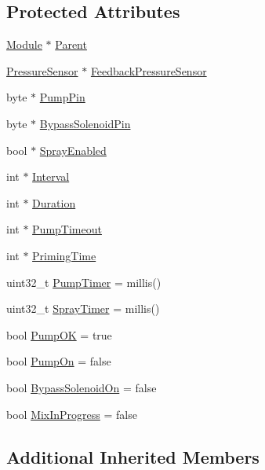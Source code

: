 \subsection*{Protected Attributes}
\begin{DoxyCompactItemize}
\item 
\hyperlink{class_module}{Module} $\ast$ \hyperlink{class_aeroponics_aa6bca341181caaa3ef15d10512d24c7b}{Parent}
\item 
\hyperlink{class_pressure_sensor}{Pressure\+Sensor} $\ast$ \hyperlink{class_aeroponics_ab5e9a2fe86a36e1e84876eb1366a2bfb}{Feedback\+Pressure\+Sensor}
\item 
byte $\ast$ \hyperlink{class_aeroponics_ad79cd6aa7f3320a84123501e3a7b8bc2}{Pump\+Pin}
\item 
byte $\ast$ \hyperlink{class_aeroponics_a1766a5f98fad0aa6fe5d3cff2be6b26a}{Bypass\+Solenoid\+Pin}
\item 
bool $\ast$ \hyperlink{class_aeroponics_ab54b25994276061212bd3e0e47871704}{Spray\+Enabled}
\item 
int $\ast$ \hyperlink{class_aeroponics_afc31194d13c3e875be4522f99df54189}{Interval}
\item 
int $\ast$ \hyperlink{class_aeroponics_a477be5d422410bb62a70a279a9f7d9f9}{Duration}
\item 
int $\ast$ \hyperlink{class_aeroponics_a17f2256a8ad90c6cac94f6129f5ba78f}{Pump\+Timeout}
\item 
int $\ast$ \hyperlink{class_aeroponics_ac7890e927a7239b8a2e013205868232a}{Priming\+Time}
\item 
uint32\+\_\+t \hyperlink{class_aeroponics_a366eb8d09ed862b4f69c6e4fbc13553f}{Pump\+Timer} = millis()
\item 
uint32\+\_\+t \hyperlink{class_aeroponics_af90abc43bd0a70431a1be41e87889813}{Spray\+Timer} = millis()
\item 
bool \hyperlink{class_aeroponics_a89ee0dc4055cd8b38e9f474e10cdfd2c}{Pump\+OK} = true
\item 
bool \hyperlink{class_aeroponics_a87054193c71ad340c0b6929037f53a8a}{Pump\+On} = false
\item 
bool \hyperlink{class_aeroponics_a8acb5d5f9ffbdf8bbdb5c888464eaf24}{Bypass\+Solenoid\+On} = false
\item 
bool \hyperlink{class_aeroponics_a938c0fe40ccb2427676a3e95ff3ba054}{Mix\+In\+Progress} = false
\end{DoxyCompactItemize}
\subsection*{Additional Inherited Members}


